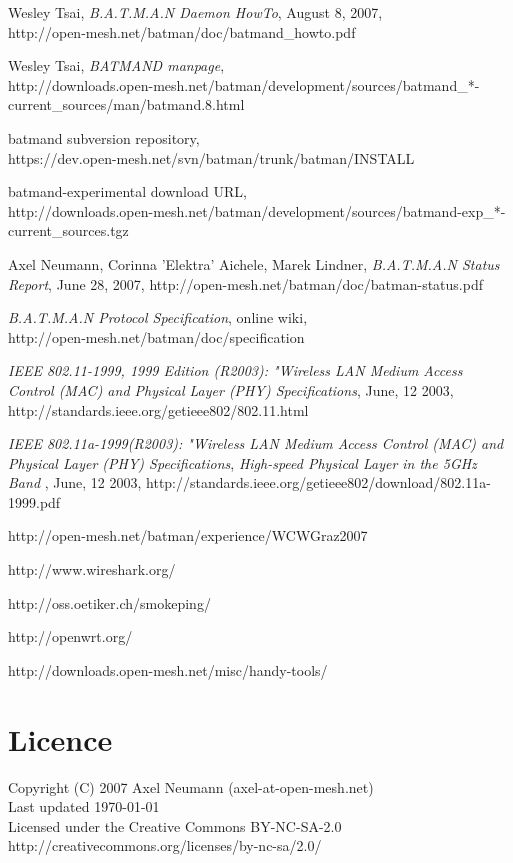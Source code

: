 \documentclass[11pt]{article}
\begin{document}
\begin{thebibliography}{1}

{Wesley Tsai},
{\it B.A.T.M.A.N Daemon HowTo}, {August 8, 2007},\\
{http://open-mesh.net/batman/doc/batmand\_howto.pdf}

{Wesley Tsai},
{\it BATMAND manpage},\\
{http://downloads.open-mesh.net/batman/development/sources/batmand\_*-current\_sources/man/batmand.8.html}

{batmand subversion repository},\\
{https://dev.open-mesh.net/svn/batman/trunk/batman/INSTALL}

{batmand-experimental download URL},\\
{http://downloads.open-mesh.net/batman/development/sources/batmand-exp\_*-current\_sources.tgz}


{Axel Neumann, Corinna 'Elektra' Aichele, Marek Lindner},
{\it B.A.T.M.A.N Status Report}, {June 28, 2007},
{http://open-mesh.net/batman/doc/batman-status.pdf}

{\it B.A.T.M.A.N Protocol Specification}, {online wiki},\\
{http://open-mesh.net/batman/doc/specification}


	{\it IEEE 802.11-1999, 1999 Edition (R2003): "Wireless LAN Medium
	Access Control (MAC) and Physical Layer (PHY) Specifications},
  {June, 12 2003},	
	http://standards.ieee.org/getieee802/802.11.html

	{\it IEEE 802.11a-1999(R2003): "Wireless LAN Medium Access Control (MAC) and Physical Layer (PHY) Specifications},
	{\it High-speed Physical Layer in the 5GHz Band },
  {June, 12 2003},	
	http://standards.ieee.org/getieee802/download/802.11a-1999.pdf

 http://open-mesh.net/batman/experience/WCWGraz2007 

 http://www.wireshark.org/

 http://oss.oetiker.ch/smokeping/

 http://openwrt.org/

 http://downloads.open-mesh.net/misc/handy-tools/

\end{thebibliography}

\section*{Licence}

Copyright (C) 2007 Axel Neumann (axel-at-open-mesh.net) \\
Last updated \today\\
Licensed under the Creative Commons BY-NC-SA-2.0 \\
http://creativecommons.org/licenses/by-nc-sa/2.0/
\end{document}
